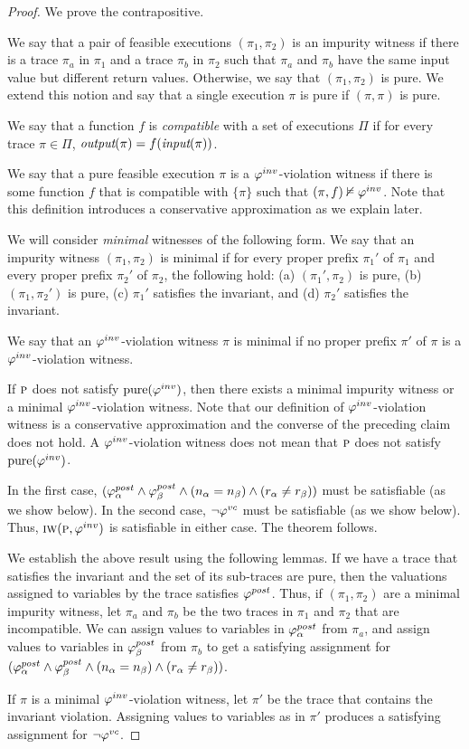 \begin{proof}
We prove the contrapositive.

We say that a pair of feasible executions $(\pi_1, \pi_2)$ is an impurity witness if there is a trace
$\pi_a$ in $\pi_1$ and a trace $\pi_b$ in $\pi_2$ such that $\pi_a$ and $\pi_b$ have the same input
value but different return values. Otherwise, we say that $(\pi_1, \pi_2)$ is pure. We extend
this notion and say that a single execution $\pi$ is pure if $(\pi,\pi)$ is pure.

We say that a function $f$ is \emph{compatible} with a set of executions $\Pi$ if for every trace
$\pi \in \Pi$, $\textit{output}(\pi) = f(\textit{input}(\pi))$.

We say that a pure feasible execution $\pi$ is a $\varphi^{inv}$-violation witness if there is some function $f$
that is compatible with $\{\pi\}$ such that $(\pi,f) \nvDash \varphi^{inv}$. Note that this definition introduces
a conservative approximation as we explain later.

We will consider \emph{minimal} witnesses of the following form.
We say that an impurity witness $(\pi_1, \pi_2)$ is minimal if for every proper prefix $\pi_1'$ of
$\pi_1$ and every proper prefix $\pi_2'$ of $\pi_2$, the following hold:
(a) $(\pi_1',\pi_2)$ is pure,
(b) $(\pi_1,\pi_2')$ is pure,
(c) $\pi_1'$ satisfies the invariant, and
(d) $\pi_2'$ satisfies the invariant.

We say that an $\varphi^{inv}$-violation witness $\pi$ is minimal if no proper prefix $\pi'$ of
$\pi$ is a $\varphi^{inv}$-violation witness.

If $\textsc{p}$ does not satisfy $\mathrm{pure}(\varphi^{inv})$, then there exists a minimal impurity witness
or a minimal $\varphi^{inv}$-violation witness. Note that our definition of $\varphi^{inv}$-violation witness is
a conservative approximation and the converse of the preceding claim does not hold.
A  $\varphi^{inv}$-violation witness does not mean that $\textsc{p}$ does not satisfy $\mathrm{pure}(\varphi^{inv})$.

In the first case, $(\varphi^{post}_\alpha \wedge \varphi^{post}_\beta \wedge (n_\alpha = n_\beta) \wedge (r_\alpha \neq r_\beta))$
must be satisfiable (as we show below). In the second case, $\neg \varphi^{vc}$ must be satisfiable (as we show below).
Thus,  $\textsc{iw}(\textsc{p}, \varphi^{inv})$  is satisfiable in either case. The theorem follows.

We establish the above result using the following lemmas.
If we have a trace that satisfies the invariant and the set of its sub-traces are pure,
then the valuations assigned to variables by the trace satisfies $\varphi^{post}$.
Thus, if $(\pi_1,\pi_2)$ are a minimal impurity witness, let $\pi_a$ and $\pi_b$
be the two traces in $\pi_1$ and $\pi_2$ that are incompatible.
We can assign values to variables in $\varphi^{post}_\alpha$ from $\pi_a$, and
assign values to variables in $\varphi^{post}_\beta$ from $\pi_b$ to get a satisfying
assignment for $(\varphi^{post}_\alpha \wedge \varphi^{post}_\beta \wedge (n_\alpha = n_\beta) \wedge (r_\alpha \neq r_\beta))$.

If $\pi$ is a minimal $\varphi^{inv}$-violation witness, let $\pi'$ be the trace that contains the invariant violation.
Assigning values to variables as in $\pi'$ produces a satisfying assignment for
$\neg \varphi^{vc}$.
\end{proof}